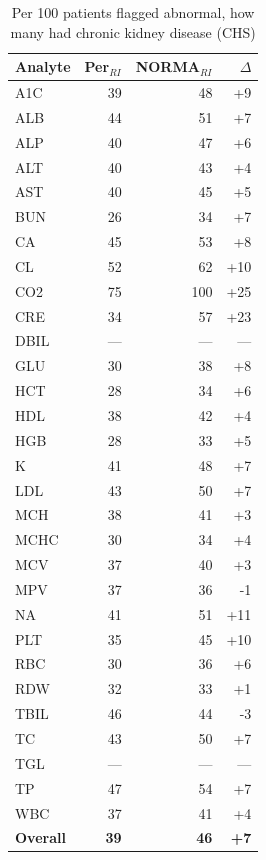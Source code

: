 \begin{table}[ht]
\centering
\footnotesize
\caption{Per 100 patients flagged abnormal, how many had chronic kidney disease (CHS)}
\begin{tabular}{lrrr}
\toprule
Analyte & Per$_{RI}$ & NORMA$_{RI}$ & $\Delta$ \\
\midrule
A1C & 39 & 48 & +9 \\
ALB & 44 & 51 & +7 \\
ALP & 40 & 47 & +6 \\
ALT & 40 & 43 & +4 \\
AST & 40 & 45 & +5 \\
BUN & 26 & 34 & +7 \\
CA & 45 & 53 & +8 \\
CL & 52 & 62 & +10 \\
CO2 & 75 & 100 & +25 \\
CRE & 34 & 57 & +23 \\
DBIL & --- & --- & --- \\
GLU & 30 & 38 & +8 \\
HCT & 28 & 34 & +6 \\
HDL & 38 & 42 & +4 \\
HGB & 28 & 33 & +5 \\
K & 41 & 48 & +7 \\
LDL & 43 & 50 & +7 \\
MCH & 38 & 41 & +3 \\
MCHC & 30 & 34 & +4 \\
MCV & 37 & 40 & +3 \\
MPV & 37 & 36 & -1 \\
NA & 41 & 51 & +11 \\
PLT & 35 & 45 & +10 \\
RBC & 30 & 36 & +6 \\
RDW & 32 & 33 & +1 \\
TBIL & 46 & 44 & -3 \\
TC & 43 & 50 & +7 \\
TGL & --- & --- & --- \\
TP & 47 & 54 & +7 \\
WBC & 37 & 41 & +4 \\
\midrule
\textbf{Overall} & \textbf{39} & \textbf{46} & \textbf{+7} \\
\bottomrule
\end{tabular}
\end{table}